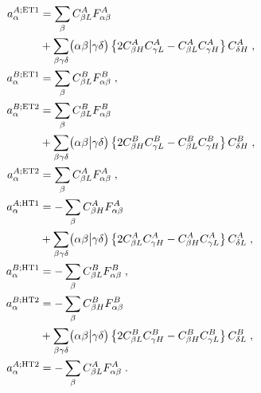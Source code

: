 \begin{subequations}\label{e:a:aoep}
\begin{align}
a_{\alpha}^{A;{\rm ET1}} &= \sum_\beta C_{\beta L}^A F_{\alpha\beta}^A \nonumber \\
 &+\sum_{\beta\gamma\delta} \braket{\alpha\beta}{\gamma\delta}
 \left\{ 2C^A_{\beta  H} C^A_{\gamma L} - C^A_{\beta  L} C^A_{\gamma H}\right\} C^A_{\delta H} \;,\\
%
a_{\alpha}^{B;{\rm ET1}} &= \sum_\beta C_{\beta L}^B F_{\alpha\beta}^B \;,\\
%
a_{\alpha}^{B;{\rm ET2}} &= \sum_\beta C_{\beta L}^B F_{\alpha\beta}^B \nonumber \\
 &+\sum_{\beta\gamma\delta} \braket{\alpha\beta}{\gamma\delta}
 \left\{ 2C^B_{\beta  H} C^B_{\gamma L} - C^B_{\beta  L} C^B_{\gamma H}\right\} C^B_{\delta H} \;,\\
%
a_{\alpha}^{A;{\rm ET2}} &= \sum_\beta C_{\beta L}^A F_{\alpha\beta}^A \;,\\
%
a_{\alpha}^{A;{\rm HT1}} &=-\sum_\beta C_{\beta H}^A F_{\alpha\beta}^A \nonumber \\
 &+\sum_{\beta\gamma\delta} \braket{\alpha\beta}{\gamma\delta}
 \left\{ 2C^A_{\beta  L} C^A_{\gamma H} - C^A_{\beta  H} C^A_{\gamma L}\right\} C^A_{\delta L} \;,\\
%
a_{\alpha}^{B;{\rm HT1}} &=-\sum_\beta C_{\beta L}^B F_{\alpha\beta}^B \;,\\
%
a_{\alpha}^{B;{\rm HT2}} &=-\sum_\beta C_{\beta H}^B F_{\alpha\beta}^B \nonumber \\
 &+\sum_{\beta\gamma\delta} \braket{\alpha\beta}{\gamma\delta}
 \left\{ 2C^B_{\beta  L} C^B_{\gamma H} - C^B_{\beta  H} C^B_{\gamma L}\right\} C^B_{\delta L} \;,\\
%
a_{\alpha}^{A;{\rm HT2}} &=-\sum_\beta C_{\beta L}^A F_{\alpha\beta}^A \;.
\end{align}
\end{subequations}
%



